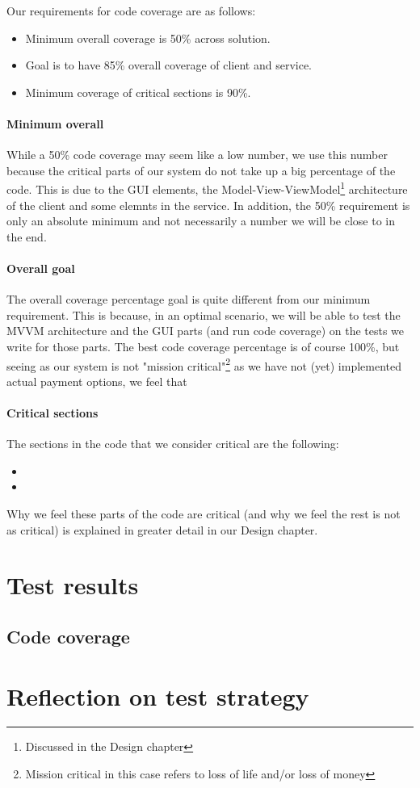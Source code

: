 Our requirements for code coverage are as follows:
\begin{itemize}
\item Minimum overall coverage is 50\% across solution.
\item Goal is to have 85\% overall coverage of client and service.
\item Minimum coverage of critical sections is 90\%.
\end{itemize}

\paragraph{Minimum overall}
While a 50\% code coverage may seem like a low number, we use this number because the critical parts of our system do not take up a big percentage of the code. This is due to the GUI elements, the Model-View-ViewModel\footnote{Discussed in the Design chapter} architecture of the client and some elemnts in the service. In addition, the 50\% requirement is only an absolute minimum and not necessarily a number we will be close to in the end.

\paragraph{Overall goal}
The overall coverage percentage goal is quite different from our minimum requirement. This is because, in an optimal scenario, we will be able to test the MVVM architecture and the GUI parts (and run code coverage) on the tests we write for those parts. The best code coverage percentage is of course 100\%, but seeing as our system is not "mission critical"\footnote{Mission critical in this case refers to loss of life and/or loss of money} as we have not (yet) implemented actual payment options, we feel that  	

\paragraph{Critical sections}


The sections in the code that we consider critical are the following:
\begin{itemize}
\item
\item
\end{itemize}

Why we feel these parts of the code are critical (and why we feel the rest is not as critical) is explained in greater detail in our Design chapter.

\section{Test results}
\label{testing_results}

\subsection{Code coverage}
\label{testing_results_coverage}

\section{Reflection on test strategy}
\label{testing_reflection}